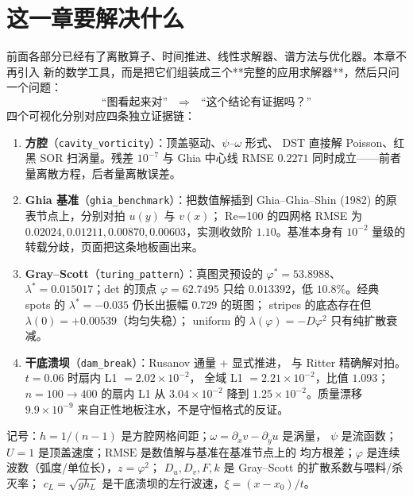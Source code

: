 

\section{这一章要解决什么}

前面各部分已经有了离散算子、时间推进、线性求解器、谱方法与优化器。本章不再引入
新的数学工具，而是把它们组装成三个**完整的应用求解器**，然后只问一个问题：
\[
  \text{“图看起来对”} \quad\Longrightarrow\quad \text{“这个结论有证据吗？”}
\]
四个可视化分别对应四条独立证据链：

\begin{enumerate}
  \item \textbf{方腔}（\texttt{cavity\_vorticity}）：顶盖驱动、$\psi$--$\omega$ 形式、
        DST 直接解 Poisson、红黑 SOR 扫涡量。残差 $10^{-7}$ 与 Ghia 中心线
        RMSE $0.2271$ 同时成立——前者量离散方程，后者量离散误差。
  \item \textbf{Ghia 基准}（\texttt{ghia\_benchmark}）：把数值解插到
        Ghia--Ghia--Shin (1982) 的原表节点上，分别对拍 $u(y)$ 与 $v(x)$；
        Re=100 的四网格 RMSE 为 $0.02024,0.01211,0.00870,0.00603$，实测收敛阶
        $1.10$。基准本身有 $10^{-2}$ 量级的转载分歧，页面把这条地板画出来。
  \item \textbf{Gray--Scott}（\texttt{turing\_pattern}）：真图灵预设的
        $\varphi^\ast=53.8988$、$\lambda^\ast=0.015017$；det 的顶点
        $\varphi=62.7495$ 只给 $0.013392$，低 $10.8\%$。经典 spots 的
        $\lambda^\ast=-0.035$ 仍长出振幅 $0.729$ 的斑图；
        stripes 的底态存在但 $\lambda(0)=+0.00539$（均匀失稳）；
        uniform 的 $\lambda(\varphi)=-D\varphi^2$ 只有纯扩散衰减。
  \item \textbf{干底溃坝}（\texttt{dam\_break}）：Rusanov 通量 + 显式推进，
        与 Ritter 精确解对拍。$t=0.06$ 时扇内 L1 $=2.02\times10^{-2}$，
        全域 L1 $=2.21\times10^{-2}$，比值 $1.093$；$n=100\to400$ 的扇内 L1
        从 $3.04\times10^{-2}$ 降到 $1.25\times10^{-2}$。质量漂移 $9.9\times10^{-9}$
        来自正性地板注水，不是守恒格式的反证。
\end{enumerate}

记号：$h=1/(n-1)$ 是方腔网格间距；$\omega=\partial_xv-\partial_yu$ 是涡量，
$\psi$ 是流函数；$U=1$ 是顶盖速度；$\mathrm{RMSE}$ 是数值解与基准在基准节点上的
均方根差；$\varphi$ 是连续波数（弧度/单位长），$z=\varphi^2$；
$D_u,D_v,F,k$ 是 Gray--Scott 的扩散系数与喂料/杀灭率；
$c_L=\sqrt{g h_L}$ 是干底溃坝的左行波速，$\xi=(x-x_0)/t$。


